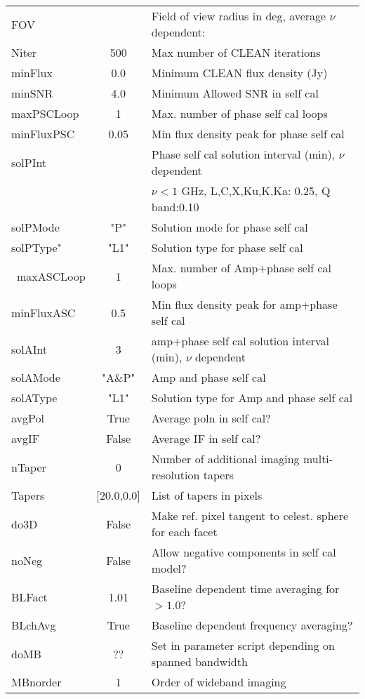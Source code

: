 \documentclass[11pt]{article}
\begin{document}
\begin{enumerate}
\begin{center}
\begin{tabular}{|l|c|l|}
FOV         &          & Field of view radius in deg, average $\nu$ dependent:\\
Niter       & 500      & Max number of CLEAN iterations\\
minFlux     & 0.0      & Minimum CLEAN flux density (Jy) \\
minSNR      & 4.0      & Minimum Allowed SNR in self cal\\
maxPSCLoop  & 1        & Max. number of phase self cal loops\\
minFluxPSC  & 0.05     & Min flux density peak for phase self cal\\
solPInt     &          & Phase self cal solution interval (min), $\nu$ dependent \\
            &          &       $\nu<1$ GHz, L,C,X,Ku,K,Ka: 0.25, Q band:0.10\\
solPMode    & "P"      & Solution mode for phase self cal\\
solPType"   & "L1"     & Solution type for phase self cal\\\
maxASCLoop  & 1        & Max. number of Amp+phase self cal loops\\
minFluxASC  & 0.5      & Min flux density peak for amp+phase self cal\\
solAInt     &   3      & amp+phase self cal solution interval (min), $\nu$ dependent\\
solAMode    & "A\&P"   & Amp and phase self cal \\
solAType    & "L1"     & Solution type for Amp and phase self cal\\
avgPol      & True     & Average poln in self cal?\\
avgIF       & False    & Average IF in self cal?\\
nTaper      & 0        & Number of additional imaging multi-resolution tapers\\
Tapers      & [20.0,0.0] &  List of tapers in pixels\\
do3D        & False    & Make ref. pixel tangent to celest. sphere for each facet\\
noNeg       & False    & Allow negative components in self cal model?\\
BLFact      & 1.01     & Baseline dependent time averaging for $>1.0$?\\
BLchAvg     & True     & Baseline dependent frequency averaging?\\
doMB        &  ??      & Set in parameter script depending on spanned bandwidth\\
MBnorder    & 1        & Order of wideband imaging \\

\end{tabular}
\end{center}
\end{enumerate}
\end{document}
